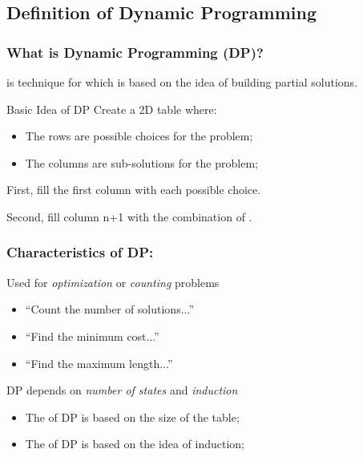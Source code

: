 \documentclass{beamer}
\begin{document}
\subsection{Definition of Dynamic Programming}
\begin{frame}
  \frametitle{What is Dynamic Programming (DP)?}

   is technique for  which is
  based on the idea of \alert{building partial solutions}.

  \bigskip

  \begin{block}{Basic Idea of DP}
    Create a 2D table where:
    \begin{itemize}
    \item The rows are possible choices for the problem;
    \item The columns are sub-solutions for the problem;
    \end{itemize}

    \medskip
    First, fill the first column with each possible choice.\\

    \medskip

    Second, fill column n+1 with the combination of .
  \end{block}
\end{frame}

\begin{frame}
  \frametitle{Characteristics of DP:}

  \begin{block}{Used for \emph{optimization} or \emph{counting} problems}
    \begin{itemize}
    \item ``Count the number of solutions...''
    \item ``Find the minimum cost...''
    \item ``Find the maximum length...''
    \end{itemize}
  \end{block}

  \begin{exampleblock}{DP depends on \emph{number of states} and \emph{induction}}
      \begin{itemize}
      \item The  of DP is based on the size of the table;
      \item The  of DP is based on the idea of induction;
      \end{itemize}
  \end{exampleblock}
\end{frame}
\end{document}
